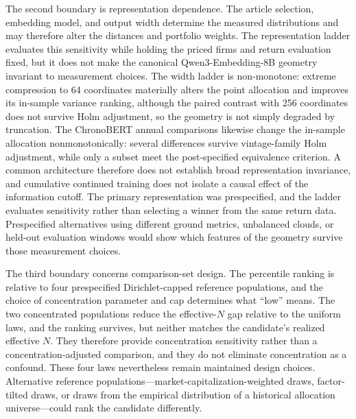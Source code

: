 The second boundary is representation dependence.
The article selection, embedding model, and output width determine the
measured distributions and may therefore alter the distances and portfolio
weights.
The representation ladder evaluates this sensitivity while holding the priced
firms and return evaluation fixed, but it does not make the canonical
Qwen3-Embedding-8B geometry invariant to measurement choices.
The width ladder is non-monotone: extreme compression to 64 coordinates
materially alters the point allocation and improves its in-sample variance
ranking, although the paired contrast with 256 coordinates does not survive
Holm adjustment, so the geometry is not simply degraded by truncation.
The ChronoBERT annual comparisons likewise change the in-sample allocation
nonmonotonically: several differences survive vintage-family Holm adjustment,
while only a subset meet the post-specified equivalence criterion.
A common architecture therefore does not establish broad representation
invariance, and cumulative continued training does not isolate a causal
effect of the information cutoff.
The primary representation was prespecified, and the ladder evaluates
sensitivity rather than selecting a winner from the same return data.
Prespecified alternatives using different ground metrics, unbalanced clouds,
or held-out evaluation windows would show which features of the geometry
survive those measurement choices.

The third boundary concerns comparison-set design.
The percentile ranking is relative to four prespecified Dirichlet-capped
reference populations, and the choice of concentration parameter and cap
determines what ``low'' means.
The two concentrated populations reduce the effective-$N$ gap relative to the
uniform laws, and the ranking survives, but neither matches the candidate's
realized effective $N$.
They therefore provide concentration sensitivity rather than a
concentration-adjusted comparison, and they do not eliminate concentration as
a confound.
These four laws nevertheless remain maintained design choices.
Alternative reference populations---market-capitalization-weighted draws,
factor-tilted draws, or draws from the empirical distribution of a historical
allocation universe---could rank the candidate differently.

